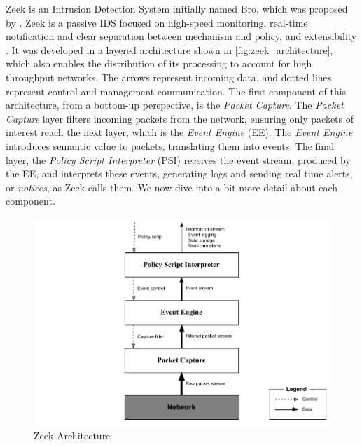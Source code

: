 Zeek is an Intrusion Detection System initially named Bro, which was proposed by . Zeek is a passive IDS focused on high-speed monitoring, real-time notification and clear separation between mechanism and policy, and extensibility \cite{Paxson1999}. It was developed in a layered architecture shown in \autoref{fig:zeek_architecture}, which also enables the distribution of its processing to account for high throughput networks. The arrows represent incoming data, and dotted lines represent control and management communication. The first component of this architecture, from a bottom-up perspective, is the \textit{Packet Capture}. The \textit{Packet Capture} layer filters incoming packets from the network, ensuring only packets of interest reach the next layer, which is the \textit{Event Engine} (EE). The \textit{Event Engine} introduces semantic value to packets, translating them into events. The final layer, the \textit{Policy Script Interpreter} (PSI) receives the event stream, produced by the EE, and interprets these events, generating logs and sending real time alerts, or \textit{notices}, as Zeek calls them. We now dive into a bit more detail about each component.

\begin{figure}[htb]
    \caption{Zeek Architecture}
    \begin{center}
        \includegraphics[width=1.0\textwidth]{images/zeek-architecture.pdf}
    \end{center}
    \label{fig:zeek_architecture}
\end{figure}

